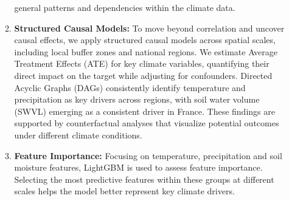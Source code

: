 \documentclass[ruler]{CUP-JNL-EDS}%
\begin{document}
\begin{itemize}
\begin{enumerate}
        general patterns and dependencies within the climate data.
        \vspace{5mm}
        \item \textbf{Structured Causal Models:} To move beyond correlation and uncover causal effects, we apply structured causal models across spatial scales, 
        including local buffer zones and national regions. We estimate Average Treatment Effects (ATE) for key climate variables, quantifying their direct impact on the target 
        while adjusting for confounders. Directed Acyclic Graphs (DAGs) consistently identify temperature and precipitation as key drivers across regions, with soil water volume (SWVL) 
        emerging as a consistent driver in France. These findings are supported by counterfactual analyses that visualize potential outcomes under different climate conditions.
        \vspace{5mm}
        \item \textbf{Feature Importance:} Focusing on temperature, precipitation and soil moisture features, LightGBM is used to assess feature importance. Selecting the most predictive 
        features within these groups at different scales helps the model better represent key climate drivers.
    \end{enumerate}
\end{itemize}
\end{document}
